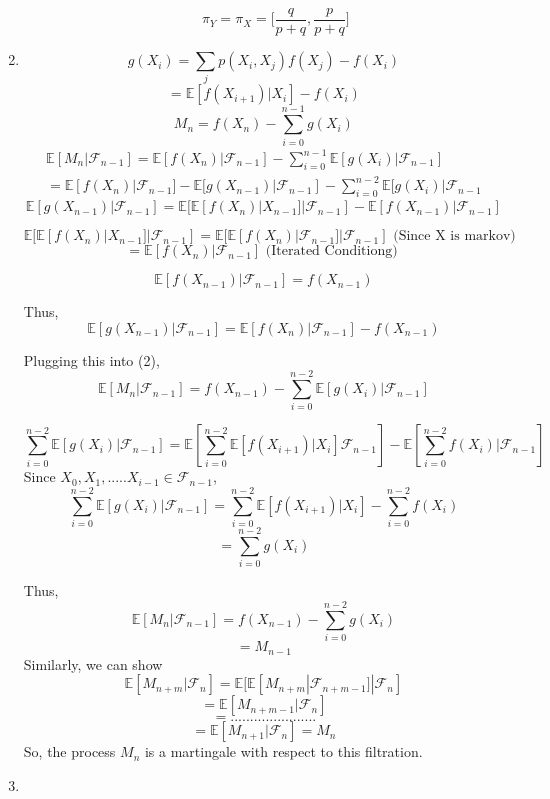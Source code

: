 \documentclass[a4paper,11pt]{article}
\begin{document}
\begin{enumerate}
\begin{enumerate}
\[\pi_Y = \pi_X = \bigg[\frac{q}{p+q} , \frac{p}{p+q}\bigg]\]

\end{enumerate}

\item
\[g(X_i)= \sum_j p(X_i,X_j)f(X_j) - f(X_i)\]
\[ = \mathbb{E}[f(X_{i+1})|X_i] - f(X_i)\]
\[M_n = f(X_n) - \sum_{i=0}^{n-1} g(X_i)\]
\begin{align} \mathbb{E}[M_n|\mathcal{F}_{n-1}] = \mathbb{E}[f(X_n)|\mathcal{F}_{n-1}]- \sum_{i=0}^{n-1} \mathbb{E}[ g(X_i)|\mathcal{F}_{n-1}] \\
 = \mathbb{E}[f(X_n)|\mathcal{F}_{n-1}]-\mathbb{E}[ g(X_{n-1})|\mathcal{F}_{n-1}] -\sum_{i=0}^{n-2} \mathbb{E}[ g(X_i)|\mathcal{F}_{n-1}
 \end{align}
\[\mathbb{E}[ g(X_{n-1})|\mathcal{F}_{n-1}]  = \mathbb{E}[\mathbb{E}[f(X_n)|X_{n-1}]|\mathcal{F}_{n-1}] - \mathbb{E}[f(X_{n-1})|\mathcal{F}_{n-1}]\]


\[\mathbb{E}[\mathbb{E}[f(X_n)|X_{n-1}]|\mathcal{F}_{n-1}] = \mathbb{E}[\mathbb{E}[f(X_n)|\mathcal{F}_{n-1}]|\mathcal{F}_{n-1}] \text{ (Since X is markov) }\]
\[ = \mathbb{E}[f(X_n)|\mathcal{F}_{n-1}] \text{ (Iterated Conditiong) }\]

\[\mathbb{E}[f(X_{n-1})|\mathcal{F}_{n-1}] = f(X_{n-1})\]

Thus,
\[\mathbb{E}[ g(X_{n-1})|\mathcal{F}_{n-1}]  = \mathbb{E}[f(X_n)|\mathcal{F}_{n-1}] - f(X_{n-1})\]

Plugging this into (2),
\[ \mathbb{E}[M_n|\mathcal{F}_{n-1}] = f(X_{n-1}) -\sum_{i=0}^{n-2} \mathbb{E}[ g(X_i)|\mathcal{F}_{n-1}]\]

\[\sum_{i=0}^{n-2} \mathbb{E}[ g(X_i)|\mathcal{F}_{n-1}] = \mathbb{E}[ \sum_{i=0}^{n-2} \mathbb{E}[f(X_{i+1})|X_i]\mathcal{F}_{n-1}] - \mathbb{E}[ \sum_{i=0}^{n-2}  f(X_i) |\mathcal{F}_{n-1}]\]
Since $X_0, X_1, ..... X_{i-1} \in \mathcal{F}_{n-1} $,
\[\sum_{i=0}^{n-2} \mathbb{E}[ g(X_i)|\mathcal{F}_{n-1}] = \sum_{i=0}^{n-2}  \mathbb{E}[f(X_{i+1})|X_i]- \sum_{i=0}^{n-2}  f(X_i) \]
\[ = \sum_{i=0}^{n-2}g(X_i)\]

Thus,
\[ \mathbb{E}[M_n|\mathcal{F}_{n-1}] = f(X_{n-1}) -\sum_{i=0}^{n-2}g(X_i)\]
\[ = M_{n-1} \]
Similarly, we can show
\[\mathbb{E}[M_{n+m}|\mathcal{F}_{n}]=\mathbb{E}[\mathbb{E}[M_{n+m}|\mathcal{F}_{n+m-1}]|\mathcal{F}_{n}] \]
\[=\mathbb{E}[M_{n+m-1}|\mathcal{F}_{n}] \]
\[= ......................\]
\[=\mathbb{E}[M_{n+1}|\mathcal{F}_{n}] = M_n\] 
So, the process $M_n$ is a martingale with respect to this filtration.

\item 


\end{enumerate}
\end{document}
